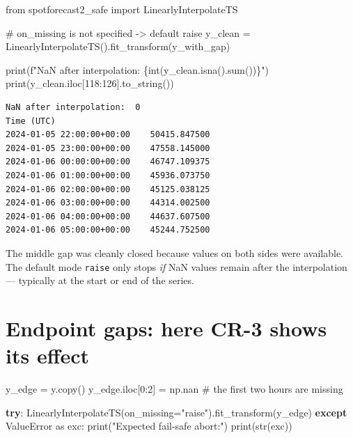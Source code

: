 \documentclass[
  english,
  letterpaper,
]{scrbook}
\newenvironment{Shaded}{\begin{snugshade}}{\end{snugshade}}
\newcommand{\BuiltInTok}[1]{\textcolor[rgb]{0.00,0.23,0.31}{#1}}
\newcommand{\CommentTok}[1]{\textcolor[rgb]{0.37,0.37,0.37}{#1}}
\newcommand{\ControlFlowTok}[1]{\textcolor[rgb]{0.00,0.23,0.31}{\textbf{#1}}}
\newcommand{\DecValTok}[1]{\textcolor[rgb]{0.68,0.00,0.00}{#1}}
\newcommand{\ImportTok}[1]{\textcolor[rgb]{0.00,0.46,0.62}{#1}}
\newcommand{\NormalTok}[1]{\textcolor[rgb]{0.00,0.23,0.31}{#1}}
\newcommand{\OperatorTok}[1]{\textcolor[rgb]{0.37,0.37,0.37}{#1}}
\newcommand{\PreprocessorTok}[1]{\textcolor[rgb]{0.68,0.00,0.00}{#1}}
\newcommand{\SpecialCharTok}[1]{\textcolor[rgb]{0.37,0.37,0.37}{#1}}
\newcommand{\SpecialStringTok}[1]{\textcolor[rgb]{0.13,0.47,0.30}{#1}}
\newcommand{\StringTok}[1]{\textcolor[rgb]{0.13,0.47,0.30}{#1}}
\begin{document}
\protect{}\label{cr3-raise}
\begin{Shaded}
\begin{Highlighting}[]
\ImportTok{from}\NormalTok{ spotforecast2\_safe }\ImportTok{import}\NormalTok{ LinearlyInterpolateTS}

\CommentTok{\# \textasciigrave{}on\_missing\textasciigrave{} is not specified {-}\textgreater{} default \textquotesingle{}raise\textquotesingle{}}
\NormalTok{y\_clean }\OperatorTok{=}\NormalTok{ LinearlyInterpolateTS().fit\_transform(y\_with\_gap)}

\BuiltInTok{print}\NormalTok{(}\SpecialStringTok{f"NaN after interpolation:  }\SpecialCharTok{\{}\BuiltInTok{int}\NormalTok{(y\_clean.isna().}\BuiltInTok{sum}\NormalTok{())}\SpecialCharTok{\}}\SpecialStringTok{"}\NormalTok{)}
\BuiltInTok{print}\NormalTok{(y\_clean.iloc[}\DecValTok{118}\NormalTok{:}\DecValTok{126}\NormalTok{].to\_string())}
\end{Highlighting}
\end{Shaded}

\begin{verbatim}
NaN after interpolation:  0
Time (UTC)
2024-01-05 22:00:00+00:00    50415.847500
2024-01-05 23:00:00+00:00    47558.145000
2024-01-06 00:00:00+00:00    46747.109375
2024-01-06 01:00:00+00:00    45936.073750
2024-01-06 02:00:00+00:00    45125.038125
2024-01-06 03:00:00+00:00    44314.002500
2024-01-06 04:00:00+00:00    44637.607500
2024-01-06 05:00:00+00:00    45244.752500
\end{verbatim}

The middle gap was cleanly closed because values on both sides were
available. The default mode \texttt{raise} only stops \emph{if} NaN
values remain after the interpolation --- typically at the start or end
of the series.

\section{Endpoint gaps: here CR-3 shows its
effect}\label{endpoint-gaps-here-cr-3-shows-its-effect}

\protect{}\label{cr3-edge}
\begin{Shaded}
\begin{Highlighting}[]
\NormalTok{y\_edge }\OperatorTok{=}\NormalTok{ y.copy()}
\NormalTok{y\_edge.iloc[}\DecValTok{0}\NormalTok{:}\DecValTok{2}\NormalTok{] }\OperatorTok{=}\NormalTok{ np.nan        }\CommentTok{\# the first two hours are missing}

\ControlFlowTok{try}\NormalTok{:}
\NormalTok{    LinearlyInterpolateTS(on\_missing}\OperatorTok{=}\StringTok{"raise"}\NormalTok{).fit\_transform(y\_edge)}
\ControlFlowTok{except} \PreprocessorTok{ValueError} \ImportTok{as}\NormalTok{ exc:}
    \BuiltInTok{print}\NormalTok{(}\StringTok{"Expected fail{-}safe abort:"}\NormalTok{)}
    \BuiltInTok{print}\NormalTok{(}\BuiltInTok{str}\NormalTok{(exc))}
\end{Highlighting}
\end{Shaded}
\end{document}
